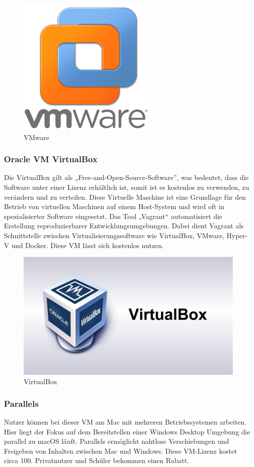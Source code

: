 \begin{figure}[H]
	\centering
	\includegraphics[width=0.3\linewidth]{images/VMware.png}
	\caption[VMware]{VMware}
	\label{fig:VMware}
\end{figure}


\subsubsection{Oracle VM VirtualBox}
Die VirtualBox gilt als „Free-and-Open-Source-Software”, was bedeutet, dass die Software unter einer Lizenz erhältlich ist, somit ist es kostenlos zu verwenden, zu verändern und zu verteilen. Diese Virtuelle Maschine ist eine Grundlage für den Betrieb von virtuellen Maschinen auf einem Host-System und wird oft in spezialisierter Software eingesetzt. Das Tool „Vagrant“ automatisiert die Erstellung reproduzierbarer Entwicklungsumgebungen. Dabei dient Vagrant als Schnittstelle zwischen Virtualisierungssoftware wie VirtualBox, VMware, Hyper-V und Docker. Diese VM lässt sich kostenlos nutzen. 

\begin{figure}[H]
	\centering
	\includegraphics[width=0.5\linewidth]{images/VirtualBox.jpg}
	\caption[VirtualBox]{VirtualBox}
	\label{fig:VirtualBox}
\end{figure}

\subsubsection{Parallels}
Nutzer können bei dieser VM am Mac mit mehreren Betriebssystemen arbeiten. Hier liegt der Fokus auf dem Bereitstellen einer Windows Desktop Umgebung die parallel zu macOS läuft. Parallels ermöglicht nahtlose Verschiebungen und Freigeben von Inhalten zwischen Mac und Windows. Diese VM-Lizenz kostet circa 100\texteuro{}. Privatnutzer und Schüler bekommen einen Rabatt. \textcite{VirtualisierungsSoftware}

